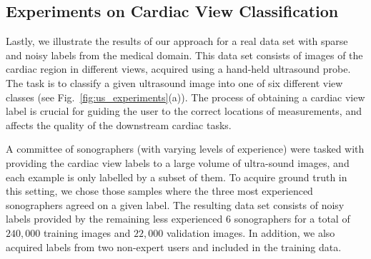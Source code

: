 
\vspace{-2mm}
\subsection{Experiments on Cardiac View Classification}
\vspace{-2mm}

Lastly, we illustrate the results of our approach for a real data set with sparse and noisy labels from the medical domain. This data set consists of images of the cardiac region in different views, acquired using a hand-held ultrasound probe. The task is to classify a given ultrasound image into one of six different view classes (see Fig.~\ref{fig:us_experiments}(a)). The process of obtaining a cardiac view label is crucial for guiding the user to the correct locations of measurements, and affects the quality of the downstream cardiac tasks. 

A committee of sonographers (with varying levels of experience) were tasked with providing the cardiac view labels to a large volume of ultra-sound images, and each example is only labelled by a subset of them. To acquire ground truth in this setting, we chose those samples where the three most experienced sonographers agreed on a given label. The resulting data set consists of noisy labels provided by the remaining less experienced $6$ sonographers for a total of $240,000$ training images and $22,000$ validation images. In addition, we also acquired labels from two non-expert users and included in the training data. 

